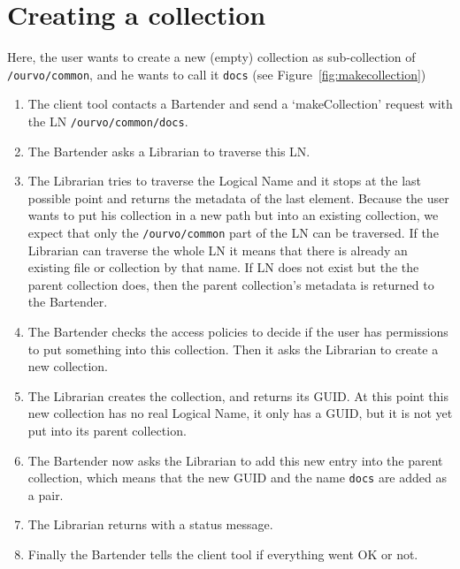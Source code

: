 \documentclass{book}
\begin{document}

\section{Creating a collection} %
\label{sec:creating_a_collection}
\begin{figure}[ht]
\end{figure}

Here, the user wants to create a new (empty) collection as sub-collection of \verb#/ourvo/common#, and he wants to call it \verb!docs! (see Figure~\ref{fig:makecollection})

\begin{enumerate}
    \item The client tool contacts a Bartender and send a `makeCollection' request with the LN \verb!/ourvo/common/docs!.
    \item The Bartender asks a Librarian to traverse this LN.
    \item The Librarian tries to traverse the Logical Name and it stops at the last possible point and returns the metadata of the last element. Because the user wants to put his collection in a new path but into an existing collection, we expect that only the \verb#/ourvo/common# part of the LN can be traversed. If the Librarian can traverse the whole LN it means that there is already an existing file or collection by that name. If LN does not exist but the the parent collection does, then the parent collection's metadata is returned to the Bartender. 
    \item The Bartender checks the access policies to decide if the user has permissions to put something into this collection. Then it asks the Librarian to create a new collection.
    \item The Librarian creates the collection, and returns its GUID. At this point this new collection has no real Logical Name, it only has a GUID, but it is not yet put into its parent collection.
    \item The Bartender now asks the Librarian to add this new entry into the parent collection, which means that the new GUID and the name \verb!docs! are added as a pair.
    \item The Librarian returns with a status message.
    \item Finally the Bartender tells the client tool if everything went OK or not.
\end{enumerate}
\end{document}
